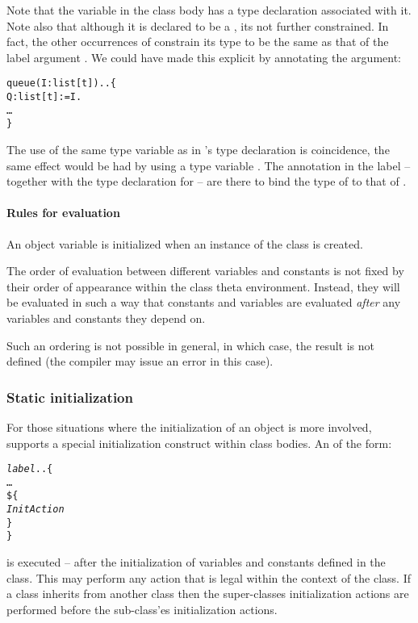 Note that the variable  in the  class body has a type declaration associated with it. Note also that although it is declared to be a , its not further constrained. In fact, the other occurrences of  constrain its type to be the same as that of the label argument . We could have made this explicit by annotating the argument:
\begin{alltt}
queue(I:list[t])..\{
  Q : list[t] := I.
  \ldots
\}
\end{alltt}
The use of the same type variable  as in 's type declaration is coincidence, the same effect would be had by using a type variable . The annotation in the label -- together with the type declaration for  -- are there to bind the type of  to that of .

\paragraph{Rules for evaluation}
An object variable is initialized when an instance of the class is created. 

The order of evaluation between different variables and constants is not fixed by their order of appearance within the class theta environment. Instead, they will be evaluated in such a way that constants and variables are evaluated \emph{after} any variables and constants they depend on.

Such an ordering is not possible in general, in which case, the result is not defined (the compiler may issue an error in this case).

\subsubsection{Static initialization}
\label{object:initialization}
For those situations where the initialization of an object is more involved, \go supports a special initialization construct within class bodies. An  of the form:
\begin{alltt}
\emph{label}..\{
  \ldots
  \$\{
    \emph{InitAction}
  \}
\}
\end{alltt}
is executed -- after the initialization of variables and constants defined in the class. This  may perform any action that is legal within the context of the class. If a class inherits from another class then the super-classes initialization actions are performed before the sub-class'es initialization actions.


